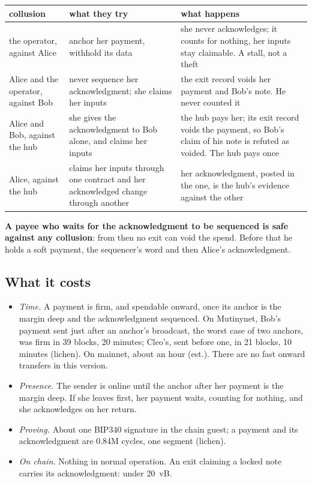 \documentclass[11pt]{article}
\begin{document}
\begin{center}
\small
\begin{tabularx}{\linewidth}{>{\raggedright\arraybackslash}p{30mm}>{\raggedright\arraybackslash}p{46mm}L}
\toprule
collusion & what they try & what happens \\
\midrule
the operator, against Alice & anchor her payment, withhold its data & she never acknowledges; it counts for nothing, her inputs stay claimable. A stall, not a theft \\
Alice and the operator, against Bob & never sequence her acknowledgment; she claims her inputs & the exit record voids her payment and Bob's note. He never counted it \\
Alice and Bob, against the hub & she gives the acknowledgment to Bob alone, and claims her inputs & the hub pays her; its exit record voids the payment, so Bob's claim of his note is refuted as voided. The hub pays once \\
Alice, against the hub & claims her inputs through one contract and her acknowledged change through another & her acknowledgment, posted in the one, is the hub's evidence against the other \\
\bottomrule
\end{tabularx}
\end{center}

\textbf{A payee who waits for the acknowledgment to be sequenced is safe
against any collusion}: from then no exit can void the spend. Before
that he holds a soft payment, the sequencer's word and then Alice's
acknowledgment.

\subsection{What it costs}

\begin{itemize}[leftmargin=1.5em]
\item \emph{Time.} A payment is firm, and spendable onward, once its
  anchor is the margin deep and the acknowledgment sequenced. On
  Mutinynet, Bob's payment sent just after an anchor's broadcast, the
  worst case of two anchors, was firm in 39 blocks, 20 minutes; Cleo's,
  sent before one, in 21 blocks, 10 minutes (lichen). On mainnet,
  about an hour (est.). There are no fast onward transfers in this
  version.
\item \emph{Presence.} The sender is online until the anchor after her
  payment is the margin deep. If she leaves first, her payment waits,
  counting for nothing, and she acknowledges on her return.
\item \emph{Proving.} About one BIP340 signature in the chain guest; a
  payment and its acknowledgment are 0.84M cycles, one segment (lichen).
\item \emph{On chain.} Nothing in normal operation. An exit claiming a
  locked note carries its acknowledgment: under 20~vB.
\end{itemize}
\end{document}
